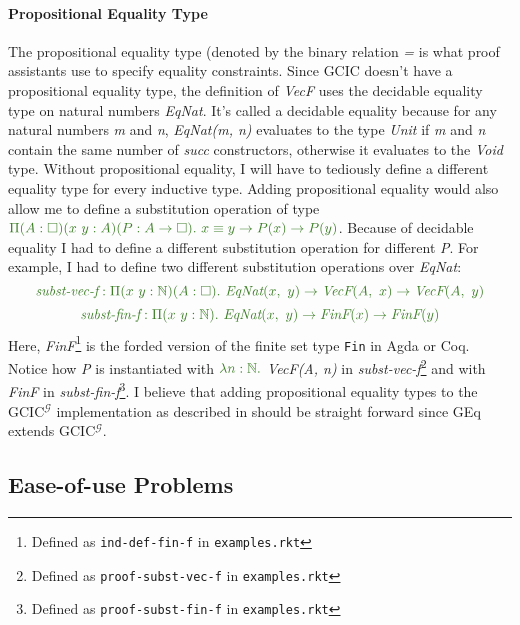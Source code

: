 \documentclass{article}
\theoremstyle{definition}
\newcommand{\Gcode}[1]{{\color{OliveGreen}\textit{#1}}}
\newcommand{\Gcmath}[1]{{\color{OliveGreen}#1}}
\newcommand{\GCICG}[0]{GCIC\(^\mathcal{G}\)}
\begin{document}
\paragraph{Propositional Equality Type}
The propositional equality type (denoted by the binary relation \Gcode{=} is
what proof assistants use to specify equality constraints. Since GCIC doesn't
have a propositional equality type, the definition of \Gcode{VecF} uses the
decidable equality type on natural numbers \Gcode{EqNat}. It's called a
decidable equality because for any natural numbers \Gcode{m} and \Gcode{n},
\Gcode{EqNat(m, n)} evaluates to the type \Gcode{Unit} if \Gcode{m} and
\Gcode{n} contain the same number of \Gcode{succ} constructors, otherwise it
evaluates to the \Gcode{Void} type. Without propositional equality, I will have
to tediously define a different equality type for every inductive type. Adding
propositional equality would also allow me to define a substitution operation of
type \(\Gcmath{\Pi (A: \square) (x\ y: A) (P: A \to \square).\ x \equiv y \to
  P(x) \to P(y)}\). Because of decidable equality I had to define a different
substitution operation for different \Gcode{P}. For example, I had to define two
different substitution operations over \Gcode{EqNat}:
\[\Gcmath{\textit{subst-vec-f}: \Pi (x\ y: \mathbb{N}) (A: \square).\
  \textit{EqNat}(x,\ y) \to \textit{VecF}(A,\ x) \to \textit{VecF}(A,\ y)}\]
\[\Gcmath{\textit{subst-fin-f}: \Pi (x\ y: \mathbb{N}).\
  \textit{EqNat}(x,\ y) \to \textit{FinF}(x) \to \textit{FinF}(y)}\] Here,
\Gcode{FinF}\footnote{Defined as \texttt{ind-def-fin-f} in
\texttt{examples.rkt}} is the forded version of the finite set type \texttt{Fin}
in Agda or Coq. Notice how \Gcode{P} is instantiated with \(\Gcmath{\lambda n:
  \mathbb{N}.}\) \Gcode{VecF(A, n)} in \Gcode{subst-vec-f}\footnote{Defined as
\texttt{proof-subst-vec-f} in \texttt{examples.rkt}} and with \Gcode{FinF} in
\Gcode{subst-fin-f}\footnote{Defined as \texttt{proof-subst-fin-f} in
\texttt{examples.rkt}}. I believe that adding propositional equality types to
the \GCICG{} implementation as described in \citet{eremondi_propositional_2022}
should be straight forward since GEq extends \GCICG{}.

\subsection{Ease-of-use Problems}\label{sec:ease-of-use}
\end{document}

